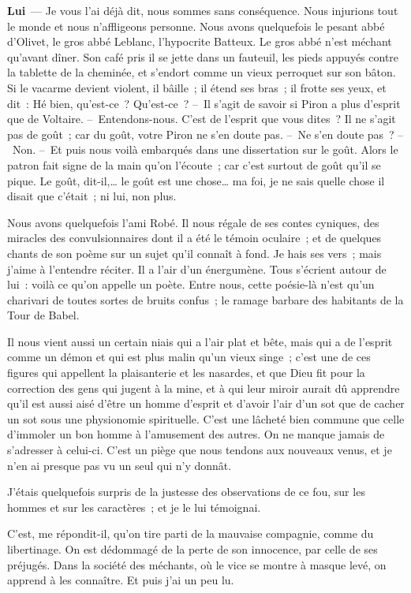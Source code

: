 \documentclass[french,twoside]{book} %
\newcommand{\labelchar}[1]{\textbf{\color{rubric} #1}}
\begin{document}
\labelchar{Lui} — Je vous l’ai déjà dit, nous sommes sans conséquence. Nous injurions tout le monde et nous n’affligeons personne. Nous avons quelquefois le pesant abbé d’Olivet, le gros abbé Leblanc, l’hypocrite Batteux. Le gros abbé n’est méchant qu’avant dîner. Son café pris il se jette dans un fauteuil, les pieds appuyés contre la tablette de la cheminée, et s’endort comme un vieux perroquet sur son bâton. Si le vacarme devient violent, il bâille ; il étend ses bras ; il frotte ses yeux, et dit : Hé bien, qu’est-ce ? Qu’est-ce ? – Il s’agit de savoir si Piron a plus d’esprit que de Voltaire. – Entendons-nous. C’est de l’esprit que vous dites ? Il ne s’agit pas de goût ; car du goût, votre Piron ne s’en doute pas. – Ne s’en doute pas ? – Non. – Et puis nous voilà embarqués dans une dissertation sur le goût. Alors le patron fait signe de la main qu’on l’écoute ; car c’est surtout de goût qu’il se pique. Le goût, dit-il,… le goût est une chose… ma foi, je ne sais quelle chose il disait que c’était ; ni lui, non plus.\par
Nous avons quelquefois l’ami Robé. Il nous régale de ses contes cyniques, des miracles des convulsionnaires dont il a été le témoin oculaire ; et de quelques chants de son poème sur un sujet qu’il connaît à fond. Je hais ses vers ; mais j’aime à l’entendre réciter. Il a l’air d’un énergumène. Tous s’écrient autour de lui : voilà ce qu’on appelle un poète. Entre nous, cette poésie-là n’est qu’un charivari de toutes sortes de bruits confus ; le ramage barbare des habitants de la Tour de Babel.\par
Il nous vient aussi un certain niais qui a l’air plat et bête, mais qui a de l’esprit comme un démon et qui est plus malin qu’un vieux singe ; c’est une de ces figures qui appellent la plaisanterie et les nasardes, et que Dieu fit pour la correction des gens qui jugent à la mine, et à qui leur miroir aurait dû apprendre qu’il est aussi aisé d’être un homme d’esprit et d’avoir l’air d’un sot que de cacher un sot sous une physionomie spirituelle. C’est une lâcheté bien commune que celle d’immoler un bon homme à l’amusement des autres. On ne manque jamais de s’adresser à celui-ci. C’est un piège que nous tendons aux nouveaux venus, et je n’en ai presque pas vu un seul qui n’y donnât.\par
J’étais quelquefois surpris de la justesse des observations de ce fou, sur les hommes et sur les caractères ; et je le lui témoignai.\par
C’est, me répondit-il, qu’on tire parti de la mauvaise compagnie, comme du libertinage. On est dédommagé de la perte de son innocence, par celle de ses préjugés. Dans la société des méchants, où le vice se montre à masque levé, on apprend à les connaître. Et puis j’ai un peu lu.\par
\end{document}
